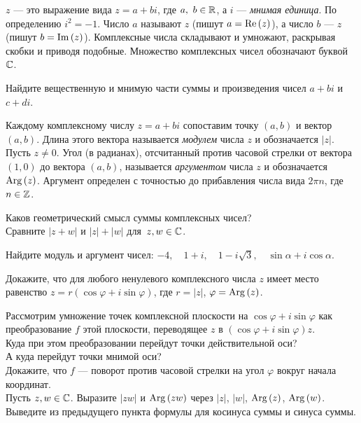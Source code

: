\documentclass[a4paper, 12pt]{article}
\begin{document}


 $z$ --- это выражение вида
$z=a+bi$, где $a,\ b\in\mathbb{R}$, а $i$ --- {\em мнимая
единица\/}. По определению  $i^2=-1$.
Число $a$ называют  %
$z$ (пишут $a={\rm Re}\,(z)$), а число $b$ ---
 $z$ (пишут $b={\rm Im}\,(z)$).
Комплексные числа складывают и умножают,
 раскрывая скобки и приводя подобные.
Множество комплексных чисел обозначают буквой $\mathbb{C}$.




Найдите вещественную и мнимую части суммы и произведения чисел $a+bi$ и $c+di$.



Каждому комплексному числу $z=a+bi$ сопоставим точку $(a,b)$
и вектор %
$(a,b)$. Длина этого вектора называется {\em модулем\/} %
числа $z$ и обозначается $|z|$.\\ Пусть $z\ne0$.
Угол (в радианах), отсчитанный против часовой стрелки
от вектора %
$(1,0)$ до вектора %
$(a,b)$,
называется {\em аргументом\/} %
числа $z$ и обозначается
${\rm Arg}\,(z)$. %
Аргумент %
определен с точностью до прибавления числа вида $2\pi n$, где $n\in\mathbb{Z}$.

 Каков геометрический смысл суммы комплексных чисел?\\
 Сравните $|z+w|$ и $|z|+|w|$ для~$z,w\in\mathbb{C}$.

Найдите модуль и аргумент чисел:  %
$-4,\quad 1+i,\quad 1-i\sqrt{3},\quad \sin\alpha+i\cos\alpha$.


Докажите, что для любого ненулевого комплексного числа $z$ имеет место
равенство $z=r (\cos \varphi +i\sin \varphi )$, где $r=|z|$,
$\varphi={\rm Arg}\,(z)$.



Рассмотрим умножение точек комплексной плоскости на %
$\cos\varphi+i\sin\varphi$ как преобразование $f$ этой плоскости, переводящее $z$ в $(\cos\varphi+i\sin\varphi)z$.\\
 Куда при этом преобразовании перейдут точки действительной оси?\\
 А куда перейдут
точки мнимой оси?\\
 Докажите, что %
$f$ --- поворот против часовой стрелки на угол $\varphi$ вокруг начала координат.\\
Пусть $z,w\in\mathbb{C}$. %
Выразите $|zw|$ и
${\rm Arg}\,(zw)$
через $|z|$, $|w|$, ${\rm Arg}\,(z)$, ${\rm Arg}\,(w)$.\\
 Выведите из предыдущего пункта
формулы для косинуса суммы и синуса суммы.
\end{document}
